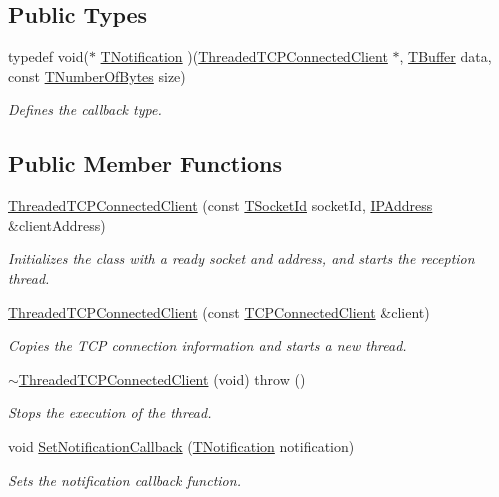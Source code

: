 \subsection*{Public Types}
\begin{DoxyCompactItemize}
\item 
typedef void($\ast$ \hyperlink{class_threaded_t_c_p_connected_client_a0b2385571a0d98483ddc7ca84bc82cf4}{T\-Notification} )(\hyperlink{class_threaded_t_c_p_connected_client}{Threaded\-T\-C\-P\-Connected\-Client} $\ast$, \hyperlink{class_socket_base_a1557d64029a25c20b4c306b80efcc143}{T\-Buffer} data, const \hyperlink{class_socket_base_ac414903631491453b96e71c06c2c2e72}{T\-Number\-Of\-Bytes} size)
\begin{DoxyCompactList}\small\item\em Defines the callback type. \end{DoxyCompactList}\end{DoxyCompactItemize}
\subsection*{Public Member Functions}
\begin{DoxyCompactItemize}
\item 
\hyperlink{class_threaded_t_c_p_connected_client_ae91cbb1c8769f9495d1f3a37258a4307}{Threaded\-T\-C\-P\-Connected\-Client} (const \hyperlink{class_socket_base_aad53265037e46768af4d6a0c2ebed277}{T\-Socket\-Id} socket\-Id, \hyperlink{class_i_p_address}{I\-P\-Address} \&client\-Address)
\begin{DoxyCompactList}\small\item\em Initializes the class with a ready socket and address, and starts the reception thread. \end{DoxyCompactList}\item 
\hyperlink{class_threaded_t_c_p_connected_client_a2841c53cd1cbc21c2a60aad8aceb7bbe}{Threaded\-T\-C\-P\-Connected\-Client} (const \hyperlink{class_t_c_p_connected_client}{T\-C\-P\-Connected\-Client} \&client)
\begin{DoxyCompactList}\small\item\em Copies the T\-C\-P connection information and starts a new thread. \end{DoxyCompactList}\item 
\hyperlink{class_threaded_t_c_p_connected_client_a0b748a1d80ddbde12b424e93807ef298}{$\sim$\-Threaded\-T\-C\-P\-Connected\-Client} (void)  throw ()
\begin{DoxyCompactList}\small\item\em Stops the execution of the thread. \end{DoxyCompactList}\item 
void \hyperlink{class_threaded_t_c_p_connected_client_ae8f981925319c228443e0ef78ef0ae67}{Set\-Notification\-Callback} (\hyperlink{class_threaded_t_c_p_connected_client_a0b2385571a0d98483ddc7ca84bc82cf4}{T\-Notification} notification)
\begin{DoxyCompactList}\small\item\em Sets the notification callback function. \end{DoxyCompactList}\end{DoxyCompactItemize}
